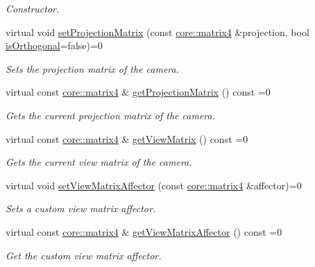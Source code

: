 \begin{DoxyCompactItemize}
\begin{DoxyCompactList}\small\item\em Constructor. \end{DoxyCompactList}\item 
virtual void \hyperlink{classirr_1_1scene_1_1ICameraSceneNode_a022415e06070ad77c6053eba64ba62ae}{set\+Projection\+Matrix} (const \hyperlink{namespaceirr_1_1core_a4c9d4e29899535971052810954a14431}{core\+::matrix4} \&projection, bool \hyperlink{classirr_1_1scene_1_1ICameraSceneNode_a5cfd588d836004923f01667543837d6c}{is\+Orthogonal}=false)=0
\begin{DoxyCompactList}\small\item\em Sets the projection matrix of the camera. \end{DoxyCompactList}\item 
virtual const \hyperlink{namespaceirr_1_1core_a4c9d4e29899535971052810954a14431}{core\+::matrix4} \& \hyperlink{classirr_1_1scene_1_1ICameraSceneNode_a80f4a43d24dc31d797a84e0e2f62f1a1}{get\+Projection\+Matrix} () const =0
\begin{DoxyCompactList}\small\item\em Gets the current projection matrix of the camera. \end{DoxyCompactList}\item 
virtual const \hyperlink{namespaceirr_1_1core_a4c9d4e29899535971052810954a14431}{core\+::matrix4} \& \hyperlink{classirr_1_1scene_1_1ICameraSceneNode_aef40bb2f8f4a95a66dbb7fc3abee3e49}{get\+View\+Matrix} () const =0
\begin{DoxyCompactList}\small\item\em Gets the current view matrix of the camera. \end{DoxyCompactList}\item 
virtual void \hyperlink{classirr_1_1scene_1_1ICameraSceneNode_adb3500cac2a8a47e6a3f48aa343ce2fd}{set\+View\+Matrix\+Affector} (const \hyperlink{namespaceirr_1_1core_a4c9d4e29899535971052810954a14431}{core\+::matrix4} \&affector)=0
\begin{DoxyCompactList}\small\item\em Sets a custom view matrix affector. \end{DoxyCompactList}\item 
virtual const \hyperlink{namespaceirr_1_1core_a4c9d4e29899535971052810954a14431}{core\+::matrix4} \& \hyperlink{classirr_1_1scene_1_1ICameraSceneNode_a033018cccdb26f94cc33256e23d764c6}{get\+View\+Matrix\+Affector} () const =0
\begin{DoxyCompactList}\small\item\em Get the custom view matrix affector. \end{DoxyCompactList}\item 

\end{DoxyCompactItemize}
